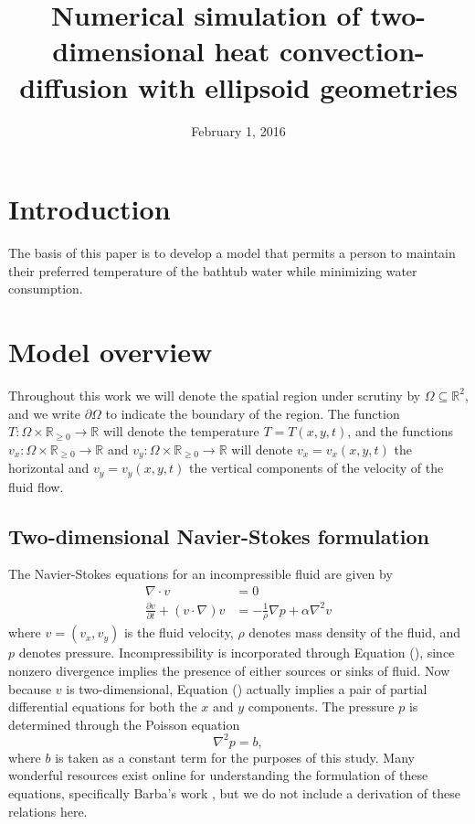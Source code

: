 \documentclass[12pt]{article}
\title{Numerical simulation of two-dimensional heat convection-diffusion with
ellipsoid geometries}
\date{February 1, 2016}
\newcommand{\R}{\mathbb{R}}
\begin{document}
\maketitle
\tableofcontents

\begin{abstract}

\end{abstract}

\section{Introduction}

The basis of this paper is to develop a model that permits a person to maintain their preferred temperature of the bathtub water while minimizing water consumption.    

\section{Model overview}

Throughout this work we will denote the spatial region under scrutiny by
$\Omega \subseteq \R^2$, and we write $\partial \Omega$ to indicate the
boundary of the region. The function $T : \Omega \times \R_{\geq 0} \to \R$
will denote the temperature $T = T(x,y,t)$, and the functions $v_x : \Omega
\times \R_{\geq 0} \to \R$ and $v_y : \Omega \times \R_{\geq 0} \to \R$ will
denote $v_x = v_x(x,y,t)$ the horizontal and $v_y = v_y(x,y,t)$ the vertical
components of the velocity of the fluid flow. 

\subsection{Two-dimensional Navier-Stokes formulation}

The Navier-Stokes equations for an incompressible fluid are given by
\begin{align}
    \nabla \cdot v &= 0 \\
    \frac{\partial v}{\partial t} + (v \cdot \nabla) v &= -
    \frac{1}{\rho} \nabla p + \alpha \nabla^2 v
    \label{eq:\theequation}
\end{align}
where $v = (v_x, v_y)$ is the fluid velocity, $\rho$ denotes mass density of
the fluid, and $p$ denotes pressure. Incompressibility is incorporated
through Equation (), since nonzero divergence implies the presence of either
sources or sinks of fluid. Now because $v$ is two-dimensional, Equation
() actually implies a pair of partial differential equations for both the $x$
and $y$ components. The pressure $p$ is determined through the Poisson equation
\begin{equation}
    \nabla^2 p = b,
    \label{eq:\theequation}
\end{equation}
where $b$ is taken as a constant term for the purposes of this study. Many
wonderful resources exist online for understanding the formulation of these
equations, specifically Barba's work \cite{12-steps}, but we do not include a
derivation of these relations here.
\end{document}
